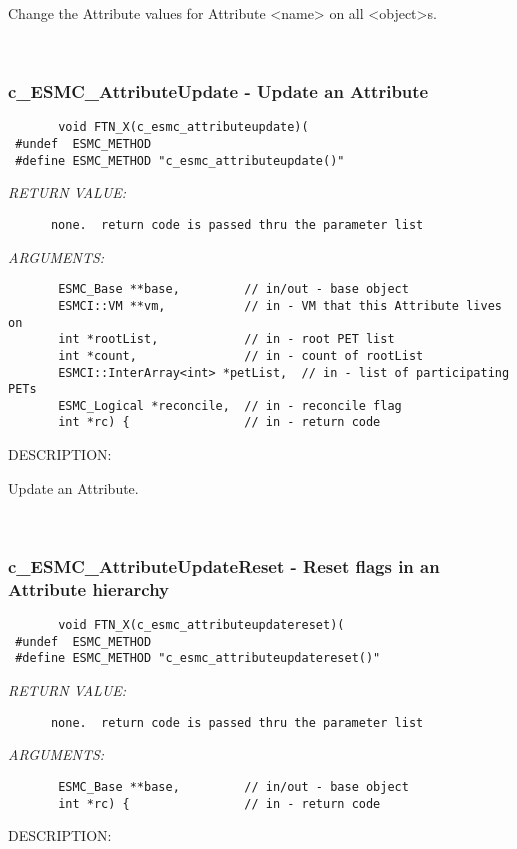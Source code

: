        Change the Attribute values for Attribute <name> on all <object>s.
   
 
\mbox{}\hrulefill\ 
 
\subsubsection [c\_ESMC\_AttributeUpdate] {c\_ESMC\_AttributeUpdate - Update an Attribute}


  
\begin{verbatim}       void FTN_X(c_esmc_attributeupdate)(
 #undef  ESMC_METHOD
 #define ESMC_METHOD "c_esmc_attributeupdate()"\end{verbatim}{\em RETURN VALUE:}
\begin{verbatim}      none.  return code is passed thru the parameter list
   \end{verbatim}{\em ARGUMENTS:}
\begin{verbatim}       ESMC_Base **base,         // in/out - base object
       ESMCI::VM **vm,           // in - VM that this Attribute lives on
       int *rootList,            // in - root PET list
       int *count,               // in - count of rootList
       ESMCI::InterArray<int> *petList,  // in - list of participating PETs
       ESMC_Logical *reconcile,  // in - reconcile flag
       int *rc) {                // in - return code
   \end{verbatim}
{\sf DESCRIPTION:\\ }


       Update an Attribute.
   
 
\mbox{}\hrulefill\ 
 
\subsubsection [c\_ESMC\_AttributeUpdateReset] {c\_ESMC\_AttributeUpdateReset - Reset flags in an Attribute hierarchy}


  
\begin{verbatim}       void FTN_X(c_esmc_attributeupdatereset)(
 #undef  ESMC_METHOD
 #define ESMC_METHOD "c_esmc_attributeupdatereset()"\end{verbatim}{\em RETURN VALUE:}
\begin{verbatim}      none.  return code is passed thru the parameter list
   \end{verbatim}{\em ARGUMENTS:}
\begin{verbatim}       ESMC_Base **base,         // in/out - base object
       int *rc) {                // in - return code
   \end{verbatim}
{\sf DESCRIPTION:\\ }



